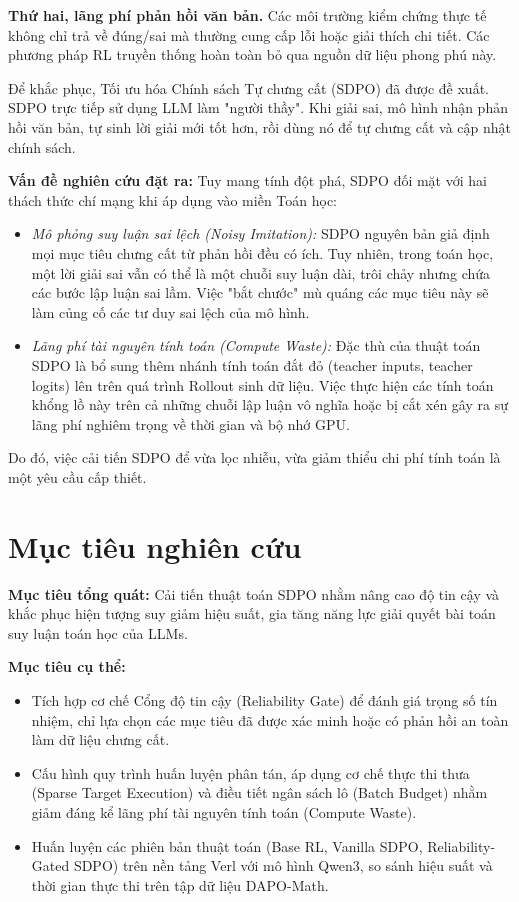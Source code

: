 \documentclass[12pt,a4paper]{report}
\begin{document}
\textbf{Thứ hai, lãng phí phản hồi văn bản.} Các môi trường kiểm chứng thực tế không chỉ trả về đúng/sai mà thường cung cấp lỗi hoặc giải thích chi tiết. Các phương pháp RL truyền thống hoàn toàn bỏ qua nguồn dữ liệu phong phú này. 

Để khắc phục, Tối ưu hóa Chính sách Tự chưng cất (SDPO) đã được đề xuất. SDPO trực tiếp sử dụng LLM làm "người thầy". Khi giải sai, mô hình nhận phản hồi văn bản, tự sinh lời giải mới tốt hơn, rồi dùng nó để tự chưng cất và cập nhật chính sách.

\textbf{Vấn đề nghiên cứu đặt ra:} Tuy mang tính đột phá, SDPO đối mặt với hai thách thức chí mạng khi áp dụng vào miền Toán học:
\begin{itemize}
    \item \textit{Mô phỏng suy luận sai lệch (Noisy Imitation):} SDPO nguyên bản giả định mọi mục tiêu chưng cất từ phản hồi đều có ích. Tuy nhiên, trong toán học, một lời giải sai vẫn có thể là một chuỗi suy luận dài, trôi chảy nhưng chứa các bước lập luận sai lầm. Việc "bắt chước" mù quáng các mục tiêu này sẽ làm củng cố các tư duy sai lệch của mô hình.
    \item \textit{Lãng phí tài nguyên tính toán (Compute Waste):} Đặc thù của thuật toán SDPO là bổ sung thêm nhánh tính toán đắt đỏ (teacher inputs, teacher logits) lên trên quá trình Rollout sinh dữ liệu. Việc thực hiện các tính toán khổng lồ này trên cả những chuỗi lập luận vô nghĩa hoặc bị cắt xén gây ra sự lãng phí nghiêm trọng về thời gian và bộ nhớ GPU.
\end{itemize}
Do đó, việc cải tiến SDPO để vừa lọc nhiễu, vừa giảm thiểu chi phí tính toán là một yêu cầu cấp thiết.

\section{Mục tiêu nghiên cứu}
\textbf{Mục tiêu tổng quát:} Cải tiến thuật toán SDPO nhằm nâng cao độ tin cậy và khắc phục hiện tượng suy giảm hiệu suất, gia tăng năng lực giải quyết bài toán suy luận toán học của LLMs.

\textbf{Mục tiêu cụ thể:}
\begin{itemize}
    \item Tích hợp cơ chế Cổng độ tin cậy (Reliability Gate) để đánh giá trọng số tín nhiệm, chỉ lựa chọn các mục tiêu đã được xác minh hoặc có phản hồi an toàn làm dữ liệu chưng cất.
    \item Cấu hình quy trình huấn luyện phân tán, áp dụng cơ chế thực thi thưa (Sparse Target Execution) và điều tiết ngân sách lô (Batch Budget) nhằm giảm đáng kể lãng phí tài nguyên tính toán (Compute Waste).
    \item Huấn luyện các phiên bản thuật toán (Base RL, Vanilla SDPO, Reliability-Gated SDPO) trên nền tảng Verl với mô hình Qwen3, so sánh hiệu suất và thời gian thực thi trên tập dữ liệu DAPO-Math.
\end{itemize}
\end{document}
